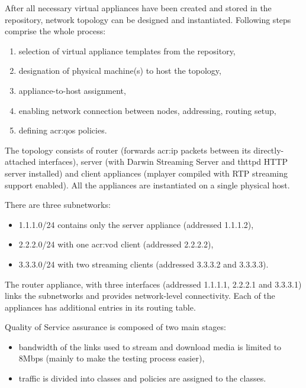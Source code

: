 \documentclass[11pt]{book}
\begin{document}
        After all necessary virtual appliances have been created and stored in the repository, network topology can be
        designed and instantiated. Following steps comprise the whole process:

        \begin{enumerate}
          \item selection of virtual appliance templates from the repository,
          \item designation of physical machine(s) to host the topology,
          \item appliance-to-host assignment,
          \item enabling network connection between nodes, addressing, routing setup,
          \item defining \gls{acr:qos} policies.
        \end{enumerate}

        The topology consists of router (forwards \gls{acr:ip} packets between its directly-attached interfaces), server (with
        Darwin Streaming Server and thttpd HTTP server installed) and client appliances (mplayer compiled with RTP
        streaming support enabled). All the appliances are instantiated on a single physical host.

        There are three subnetworks:

        \begin{itemize}
          \item 1.1.1.0/24 contains only the server appliance (addressed 1.1.1.2),
          \item 2.2.2.0/24 with one \gls{acr:vod} client (addressed 2.2.2.2),
          \item 3.3.3.0/24 with two streaming clients (addressed 3.3.3.2 and 3.3.3.3).
        \end{itemize}

        The router appliance, with three interfaces (addressed 1.1.1.1, 2.2.2.1 and 3.3.3.1) links the subnetworks and
        provides network-level connectivity. Each of the appliances has additional entries in its routing table.

        Quality of Service assurance is composed of two main stages:

        \begin{itemize}
          \item bandwidth of the links used to stream and download media is limited to 8Mbps (mainly to make the
                testing process easier),
          \item traffic is divided into classes and policies are assigned to the classes.
        \end{itemize}
\end{document}
